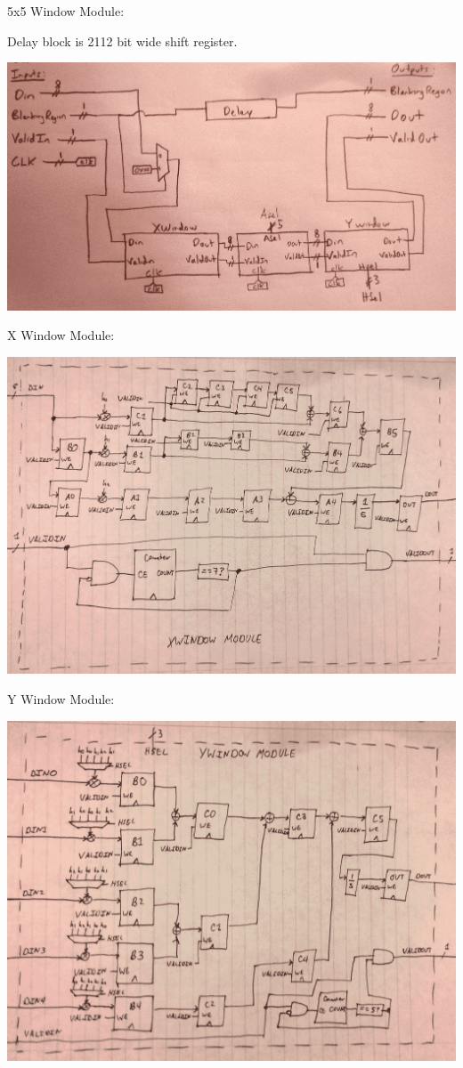 \documentclass[11pt]{article}
\begin{document}
5x5 Window Module:

Delay block is 2112 bit wide shift register.

\noindent\includegraphics[width=\textwidth]{modules/proc5x5window.png}

X Window Module:

\noindent\includegraphics[width=\textwidth]{modules/procx_window.png}

Y Window Module:

\noindent\includegraphics[width=\textwidth]{modules/procy_window.png}
\end{document}
